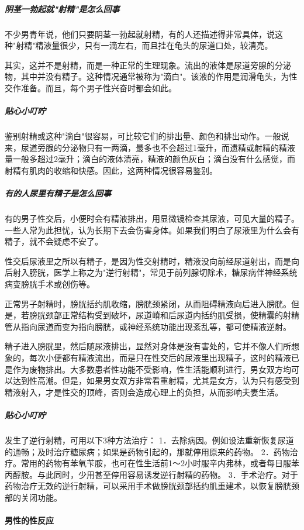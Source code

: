 \subparagraph{阴茎一勃起就"射精"是怎么回事}

不少男青年说，他们只要阴茎一勃起就射精，有的人还描述得非常具体，说这种"射精"精液量很少，只有一滴左右，而且挂在龟头的尿道口处，较清亮。

其实，这并不是射精，而是一种正常的生理现象。流出的液体是尿道旁腺的分泌物，其中并没有精子。这种情况通常被称为"滴白"。该液的作用是润滑龟头，为性交作准备。而且，每个男子性兴奋时都会如此。

\subparagraph{贴心小叮咛}

鉴别射精或这种"滴白"很容易，可比较它们的排出量、颜色和排出动作。一般说来，尿道旁腺的分泌物只有一两滴，最多也不会超过1毫升，而遗精或射精的精液量一般多超过2毫升；滴白的液体清亮，精液的颜色灰白；滴白没有什么感觉，而射精有肌肉的收缩和快感。因此，这两种情况很容易鉴别。

\subparagraph{有的人尿里有精子是怎么回事}

有的男子性交后，小便时会有精液排出，用显微镜检查其尿液，可见大量的精子。一些人常为此担忧，认为长期下去会伤害身体。如果我们明白了尿液里为什么会有精子，就不会疑虑不安了。

性交后尿液里之所以有精子，是因为性交射精时，精液没向前经尿道射出，而是向后射入膀胱，医学上称之为"逆行射精"，常见于前列腺切除术，糖尿病伴神经系统病变膀胱手术或创伤等。

正常男子射精时，膀胱括约肌收缩，膀胱颈紧闭，从而阻碍精液向后进入膀胱。但是，若膀胱颈部正常结构受到破坏，尿道嵴和后尿道内括约肌受损，使精囊的射精管从指向尿道而变为指向膀胱，或神经系统功能出现紊乱等，都可使精液逆射。

精子进入膀胱里，然后随尿液排出，显然对身体是没有害处的，它并不像人们所想象的，每次小便都有精液流出，而是只在性交后的尿液里出现精子，这时的精液已是作为废物排出。大多数患者性功能不受影响，性生活能顺利进行，男女双方均可以达到性高潮。但是，如果男女双方非常看重射精，尤其是女方，认为只有感受到精液射入，才是性交的顶峰，否则会造成心理上的负担，从而影响夫妻生活。

\subparagraph{贴心小叮咛}

发生了逆行射精，可用以下3种方法治疗：
1．去除病因。例如设法重新恢复尿道的通畅；及时治疗糖尿病；如果是药物引起的，那就停用原来的药物。
2．药物治疗。常用的药物有苯氧苄胺，也可在性生活前1～2小时服辛内弗林，或者每日服苯丙醇胺。与此同时，少用甚至停用容易诱发逆行射精的药物。
3．手术治疗。对于药物治疗无效的逆行射精，可以采用手术做膀胱颈部括约肌重建术，以恢复膀胱颈部的关闭功能。

\paragraph{男性的性反应}

